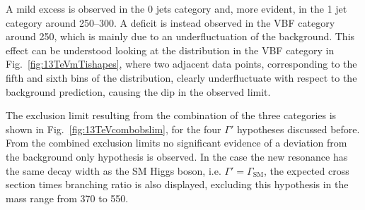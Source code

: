 A mild excess is observed in the 0 jets category and, more evident, in the 1 jet category around 250--300\GeV. A deficit is instead observed in the VBF category around 250\GeV, which is mainly due to an underfluctuation of the background. This effect can be understood looking at the distribution in the VBF category in Fig.~\ref{fig:13TeVmTishapes}, where two adjacent data points, corresponding to the fifth and sixth bins of the \mti distribution, clearly underfluctuate with respect to the background prediction, causing the dip in the observed limit.

The exclusion limit resulting from the combination of the three categories is shown in Fig.~\ref{fig:13TeVcombobslim}, for the four $\Gamma'$ hypotheses discussed before. From the combined exclusion limits no significant evidence of a deviation from the background only hypothesis is observed. In the case the new resonance has the same decay width as the SM Higgs boson, i.e. $\Gamma'=\Gamma_\mathrm{SM}$, the expected cross section times branching ratio is also displayed, excluding this hypothesis in the mass range from 370 to 550\GeV.

